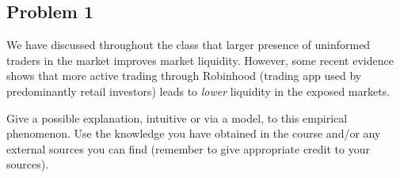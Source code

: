 


\ifexam

\subsection*{Problem 1}
	We have discussed throughout the class that larger presence of uninformed traders in the market improves market liquidity. However, some recent evidence shows that more active trading through Robinhood (trading app used by predominantly retail investors) leads to \emph{lower} liquidity in the exposed markets.
	
	Give a possible explanation, intuitive or via a model, to this empirical phenomenon. Use the knowledge you have obtained in the course and/or any external sources you can find (remember to give appropriate credit to your sources).



